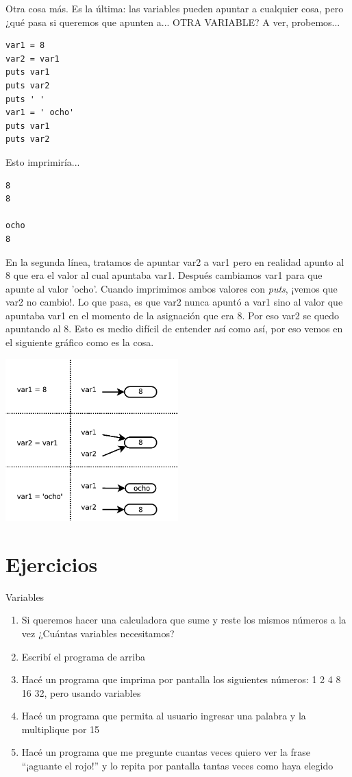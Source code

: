 Otra cosa más. Es la última: las variables pueden apuntar a cualquier cosa, pero ¿qué pasa si queremos que apunten a... OTRA VARIABLE?   A ver, probemos...

\begin{lstlisting}
var1 = 8
var2 = var1
puts var1
puts var2
puts ' '
var1 = ' ocho'
puts var1
puts var2
\end{lstlisting}

Esto imprimiría... 

\begin{lstlisting}
8
8

ocho
8
\end{lstlisting}

En la segunda línea, tratamos de apuntar var2 a var1 pero en realidad apunto al 8 que era el valor al cual apuntaba var1. Después cambiamos var1 para que apunte al valor 'ocho'. Cuando imprimimos ambos valores con \emph{puts}, ¡vemos que var2 no cambio!. Lo que pasa, es que var2 nunca apuntó a var1 sino al valor que apuntaba var1 en el momento de la asignación que era 8. Por eso var2 se quedo apuntando al 8. Esto es medio difícil de entender así como así, por eso vemos en el siguiente gráfico como es la cosa.

\begin{center}
\includegraphics[width=0.5\textwidth]{cap03_fig01}
\end{center}

\section{Ejercicios}
\begin{ejercicio}{Variables}{
\begin{enumerate}
  \item Si queremos hacer una calculadora que sume y reste los mismos números a la vez ¿Cuántas variables necesitamos?
  \item Escribí el programa de arriba
  \item Hacé un programa que imprima por pantalla los siguientes números: 1 2 4 8 16 32, pero usando variables
  \item Hacé un programa que permita al usuario ingresar una palabra y la multiplique por 15
  \item Hacé un programa que me pregunte cuantas veces quiero ver la frase “¡aguante el rojo!” y lo repita por pantalla tantas veces como haya elegido
\end{enumerate} 
}
\end{ejercicio}
